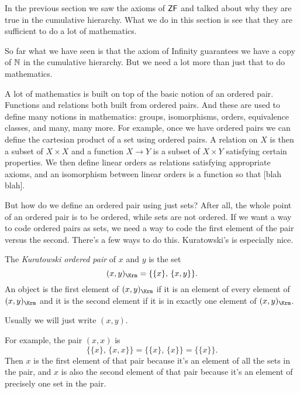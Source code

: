 \documentclass[10pt]{amsart}
\begin{document}
In the previous section we saw the axioms of $\mathsf{ZF}$ and talked about why they are true in the cumulative hierarchy. What we do in this section is see that they are sufficient to do a lot of mathematics. 

So far what we have seen is that the axiom of Infinity guarantees we have a copy of $\mathbb{N}$ in the cumulative hierarchy. But we need a lot more than just that to do mathematics. 

A lot of mathematics is built on top of the basic notion of an ordered pair. Functions and relations both built from ordered pairs. And these are used to define many notions in mathematics: groups, isomorphisms, orders, equivalence classes, and many, many more. For example, once we have ordered pairs we can define the cartesian product of a set using ordered pairs. A relation on $X$ is then a subset of $X \times X$ and a function $X \to Y$ is a subset of $X \times Y$ satisfying certain properties. We then define linear orders as relations satisfying appropriate axioms, and an isomorphism between linear orders is a function so that [blah blah]. 

But how do we define an ordered pair using just sets? After all, the whole point of an ordered pair is to be ordered, while sets are not ordered. If we want a way to code ordered pairs as sets, we need a way to code the first element of the pair versus the second. There's a few ways to do this. Kuratowski's is especially nice.

\begin{definition}[Kuratowski]
The \emph{Kuratowski ordered pair} of $x$ and $y$ is the set 
\[
(x,y)_\Krm = \{ \{x\},\,\{x,y\} \}. 
\]
An object is the first element of $(x,y)_\Krm$ if it is an element of every element of $(x,y)_\Krm$ and it is the second element if it is in exactly one element of $(x,y)_\Krm$.

Usually we will just write $(x,y)$.
\end{definition}

For example, the pair $(x,x)$ is 
\[
\{ \{x\},\,\{x,x\} \} = \{ \{x\},\,\{x\} \} = \{ \{ x \} \}.
\]
Then $x$ is the first element of that pair because it's an element of all the sets in the pair, and $x$ is also the second element of that pair because it's an element of precisely one set in the pair.
\end{document}
